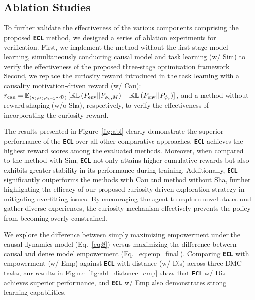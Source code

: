 \subsection{Ablation Studies}
\label{Ablation Studies}

To further validate the effectiveness of the various components comprising the proposed \texttt{\textbf{ECL}} method, we designed a series of ablation experiments for verification. 
First, we implement the method without the first-stage model learning, simultaneously conducting causal model and task learning (w/ Sim) to verify the effectiveness of the proposed three-stage optimization framework. 
Second, we replace the curiosity reward introduced in the task learning with a causality motivation-driven reward (w/ Cau): $r_{\mathrm{cau}}=\mathbb{E}_{(s_t, a_t, s_{t+1} \sim \mathcal{D})}\left[{\mathbb{KL}}\left({P}_{\rm{env}}||{P}_{{\phi_c},M}\right)-{\mathbb{KL}}\left({P}_{\rm{env}}||{P}_{\phi_c}\right)\right], $ and a method without reward shaping (w/o Sha), respectively, to verify the effectiveness of incorporating the curiosity reward.

The results presented in Figure~\ref{fig:abl} clearly demonstrate the superior performance of the \texttt{\textbf{ECL}} over all other comparative approaches. \texttt{\textbf{ECL}} achieves the highest reward scores among the evaluated methods. Moreover, when compared to the method with Sim, \texttt{\textbf{ECL}} not only attains higher cumulative rewards but also exhibits greater stability in its performance during training. 
Additionally, \texttt{\textbf{ECL}} significantly outperforms the methods with Cau and method without Sha, further highlighting the efficacy of our proposed curiosity-driven exploration strategy in mitigating overfitting issues. By encouraging the agent to explore novel states and gather diverse experiences, the curiosity mechanism effectively prevents the policy from becoming overly constrained.

We explore the difference between simply maximizing empowerment under the causal dynamics model (Eq.~\ref{eq:8}) versus maximizing the difference between causal and dense model empowerment (Eq.~\ref{eq:emp_final}). Comparing \texttt{\textbf{ECL}} with empowerment (w/ Emp) against \texttt{\textbf{ECL}} with distance (w/ Dis) across three DMC tasks, our results in Figure~\ref{fig:abl_distance_emp} show that \texttt{\textbf{ECL}} w/ Dis achieves superior performance, and \texttt{\textbf{ECL}} w/ Emp also demonstrates strong learning capabilities.

